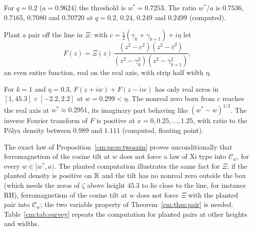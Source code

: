 For $q=0.2$ ($a=0.9624$) the threshold is $w^*=0.7253$. The ratio $w^*/a$ is $0.7536$, $0.7165$, $0.7080$ and $0.70720$ at $q=0.2$, $0.24$, $0.249$ and $0.2499$ (computed).

Plant a pair off the line in $\Xi$: with $c=\frac12(\gamma_k+\gamma_{k+1})+i\eta$ let
\[
F(z)=\Xi(z)\,\frac{(z^2-c^2)(z^2-\bar c^2)}{(z^2-\gamma_k^2)(z^2-\gamma_{k+1}^2)},
\]
an even entire function, real on the real axis, with strip half width $\eta$.

\begin{proposition}\label{cm:prop:counter}
For $k=1$ and $\eta=0.3$, $F(z+iw)+F(z-iw)$ has only real zeros in $[1,45.3]\times[-2.2,2.2]$ at $w=0.299<\eta$. The nonreal zero born from $c$ reaches the real axis at $w^*\approx0.2951$, its imaginary part behaving like $(w^*-w)^{1/2}$. The inverse Fourier transform of $F$ is positive at $x=0,0.25,\dots,1.25$, with ratio to the P\'olya density between $0.989$ and $1.111$ (computed, floating point).
\end{proposition}

The exact law of Proposition~\ref{cm:prop:twospin} proves unconditionally that ferromagnetism of the cosine tilt at $w$ does not force a law of Xi type into $\mathcal C_w$, for every $w\in[w^*,a)$. The planted computation illustrates the same fact for $\Xi$: if the planted density is positive on $\mathbb{R}$ and the tilt has no nonreal zero outside the box (which needs the zeros of $\zeta$ above height $45.3$ to lie close to the line, for instance RH), ferromagnetism of the cosine tilt at $w$ does not force $\Xi$ with the planted pair into $\mathcal C_w$; the two variable property of Theorem~\ref{cm:thm:pair} is needed. Table~\ref{cm:tab:survey} repeats the computation for planted pairs at other heights and widths.

